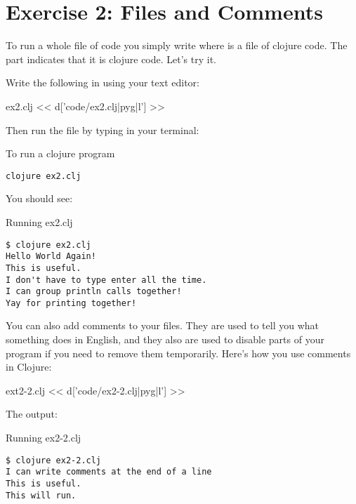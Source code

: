 \chapter{Exercise 2: Files and Comments}

To run a whole file of code you simply write  where  is a file of clojure code. The  part indicates that it is clojure code. Let's try it.

Write the following in  using your text editor:

\begin{code}{ex2.clj}
<< d['code/ex2.clj|pyg|l'] >>
\end{code}

Then run the file by typing in your terminal:

\begin{code}{To run a clojure program}
\begin{Verbatim}
clojure ex2.clj
\end{Verbatim}
\end{code}

You should see:

\begin{code}{Running ex2.clj}
\begin{Verbatim}
$ clojure ex2.clj 
Hello World Again!
This is useful.
I don't have to type enter all the time.
I can group println calls together!
Yay for printing together!
\end{Verbatim}
\end{code}


You can also add comments to your files. They are used to tell you
what something does in English, and they also are used to disable parts
of your program if you need to remove them temporarily. Here's how you
use comments in Clojure:
	
\begin{code}{ext2-2.clj}
<< d['code/ex2-2.clj|pyg|l'] >>
\end{code}


The output:

\begin{code}{Running ex2-2.clj}
\begin{Verbatim}
$ clojure ex2-2.clj 
I can write comments at the end of a line
This is useful.
This will run.
\end{Verbatim}
\end{code}
